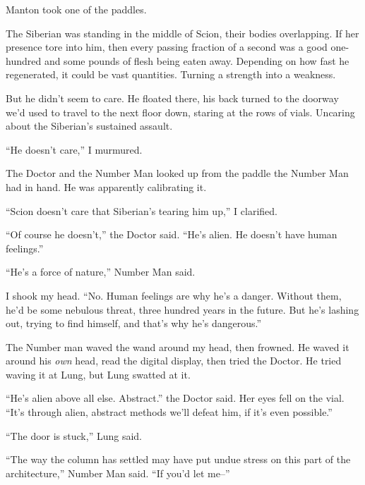 Manton took one of the paddles.



The Siberian was standing in the middle of Scion, their bodies overlapping.  If her presence tore into him, then every passing fraction of a second was a good one-hundred and some pounds of flesh being eaten away.  Depending on how fast he regenerated, it could be vast quantities.  Turning a strength into a weakness.



But he didn't seem to care.  He floated there, his back turned to the doorway we'd used to travel to the next floor down, staring at the rows of vials.  Uncaring about the Siberian's sustained assault.



``He doesn't care,'' I murmured.



The Doctor and the Number Man looked up from the paddle the Number Man had in hand.  He was apparently calibrating it.



``Scion doesn't care that Siberian's tearing him up,'' I clarified.



``Of course he doesn't,'' the Doctor said.  ``He's alien.  He doesn't have human feelings.''



``He's a force of nature,'' Number Man said.



I shook my head.  ``No.  Human feelings are why he's a danger.  Without them, he'd be some nebulous threat, three hundred years in the future.  But he's lashing out, trying to find himself, and that's why he's dangerous.''



The Number man waved the wand around my head, then frowned.  He waved it around his \emph{own} head, read the digital display, then tried the Doctor.  He tried waving it at Lung, but Lung swatted at it.



``He's alien above all else.  Abstract.'' the Doctor said.  Her eyes fell on the vial.  ``It's through alien, abstract methods we'll defeat him, if it's even possible.''



``The door is stuck,'' Lung said.



``The way the column has settled may have put undue stress on this part of the architecture,'' Number Man said.  ``If you'd let me--''



